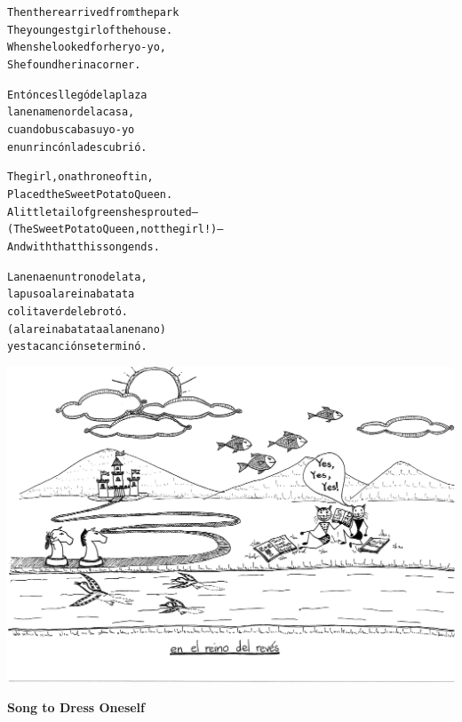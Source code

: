 \documentclass[11pt,a4paper]{article}
\begin{document}
\begin{parcolumns}{2}
\colchunk
{
\begin{alltt}\normalfont
Then there arrived from the park
The youngest girl of the house.
When she looked for her yo-yo,
She found her in a corner.
\end{alltt}
}

\colchunk
{
\begin{alltt}\normalfont
Entónces llegó de la plaza
la nena menor de la casa,
cuando buscaba su yo-yo
en un rincón la descubrió.
\end{alltt}
}

\colplacechunks

\colchunk
{
\begin{alltt}\normalfont
The girl, on a throne of tin,
Placed the Sweet Potato Queen.
A little tail of green she sprouted –
(The Sweet Potato Queen, not the girl!) –
And with that this song ends.
\end{alltt}
}

\colchunk
{
\begin{alltt}\normalfont
La nena en un trono de lata,
la puso a la reina batata
colita verde le brotó.
(a la reina batata a la nena no)
y esta canción se terminó.
\end{alltt}
}

\colplacechunks

\end{parcolumns}

\clearpage


\bigskip
\centerline{\includegraphics[page=5,scale=0.7,clip=true,trim = 8cm 3mm 4cm 4cm]{20150406235752619.pdf}}
\begin{center}\large\textbf{Song to Dress Oneself}\end{center}
\end{document}
